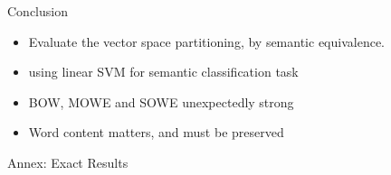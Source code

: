 \documentclass[12pt,landscape,english]{beamer}
\begin{document}
\begin{frame}[fragile]{Conclusion}

	
	\begin{itemize}
	\item Evaluate the vector space partitioning, by semantic equivalence.
	\item using linear SVM for semantic classification task
	\item BOW, MOWE and SOWE unexpectedly strong
	\item Word content matters, and must be preserved
	\end{itemize}
\end{frame}


\begin{frame}{Annex: Exact Results}
	\centering\pgfplotstabletypeset[columns={Name, MSRP, Opiniosis}, 
		every head row/.style={before row=\toprule,after row=\midrule},
		columns/Name/.style={string type},
		skip rows between index={7}{10}]\resultstable
\end{frame}
\end{document}
